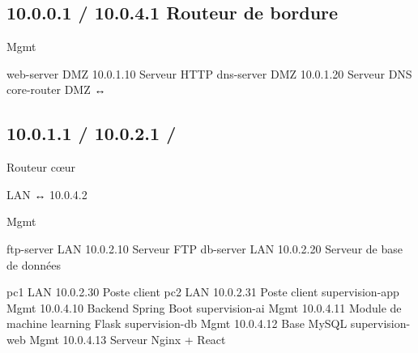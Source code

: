 \documentclass[12pt,a4paper]{report}
\begin{document}
\subsection*{10.0.0.1 / 10.0.4.1 Routeur de bordure}
Mgmt\par
web-server DMZ 10.0.1.10 Serveur HTTP dns-server DMZ 10.0.1.20 Serveur DNS core-router DMZ ↔\par
\subsection*{10.0.1.1 / 10.0.2.1 /}
Routeur cœur\par
LAN ↔ 10.0.4.2\par
Mgmt\par
ftp-server LAN 10.0.2.10 Serveur FTP db-server LAN 10.0.2.20 Serveur de base de données\par
pc1 LAN 10.0.2.30 Poste client pc2 LAN 10.0.2.31 Poste client supervision-app Mgmt 10.0.4.10 Backend Spring Boot supervision-ai Mgmt 10.0.4.11 Module de machine learning Flask supervision-db Mgmt 10.0.4.12 Base MySQL supervision-web Mgmt 10.0.4.13 Serveur Nginx + React\par
\end{document}
